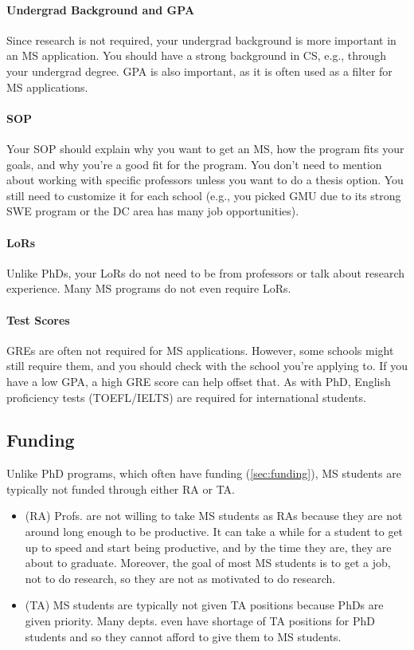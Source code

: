 \documentclass[oneside,11pt,dvipsnames]{book}
\begin{document}
\paragraph{Undergrad Background and GPA} Since research is not required, your undergrad background is more important in an MS application.  You should have a strong background in CS, e.g., through your undergrad degree.  GPA is also important, as it is often used as a filter for MS applications.

\paragraph{SOP} Your SOP should explain why you want to get an MS, how the program fits your goals, and why you're a good fit for the program.  You don't need to mention about working with specific professors unless you want to do a thesis option. You still need to customize it for each school (e.g., you picked GMU due to its strong SWE program or the DC area has many job opportunities).

\paragraph{LoRs} Unlike PhDs, your LoRs do not need to be from professors or talk about research experience. Many MS programs do not even require LoRs.

\paragraph{Test Scores} GREs are often not required for MS applications.  However, some schools might still require them, and you should check with the school you're applying to.  If you have a low GPA, a high GRE score can help offset that. As with PhD, English proficiency tests (TOEFL/IELTS) are required for international students.

\subsection{Funding}
Unlike PhD programs, which often have funding (\autoref{sec:funding}), MS students are typically not funded through either RA or TA.
\begin{itemize}
\item (RA) Profs. are not willing to take MS students as RAs because they are not around long enough to be productive. It can take a while for a student to get up to speed and start being productive, and by the time they are, they are about to graduate. Moreover, the goal of most MS students is to get a job, not to do research, so they are not as motivated to do research.
\item (TA) MS students are typically not given TA positions because PhDs are given priority. Many depts. even have shortage of TA positions for PhD students and so they cannot afford to give them to MS students.
\end{itemize}
\end{document}
